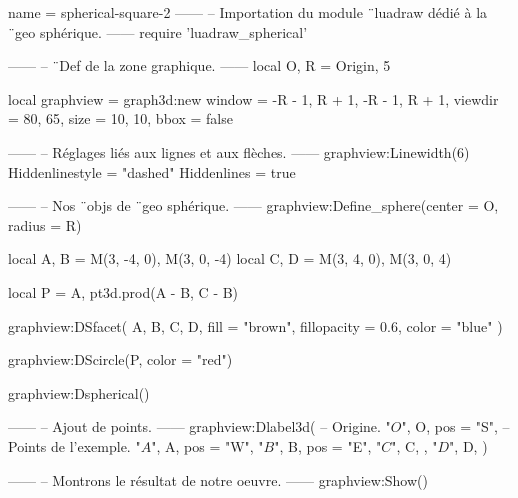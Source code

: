 \documentclass[border = 3pt]{standalone}
\begin{document}
\begin{luadraw}{name = spherical-square-2}
------
-- Importation du module ¨luadraw dédié à la ¨geo sphérique.
------
require 'luadraw_spherical'

------
-- ¨Def de la zone graphique.
------
local O, R = Origin, 5

local graphview = graph3d:new{
  window  = {-R - 1, R + 1, -R - 1, R + 1},
  viewdir = {80, 65},
  size    = {10, 10},
  bbox    = false
}

------
-- Réglages liés aux lignes et aux flèches.
------
graphview:Linewidth(6)
Hiddenlinestyle = "dashed"
Hiddenlines     = true

------
-- Nos ¨objs de ¨geo sphérique.
------
graphview:Define_sphere({center = O, radius = R})

local A, B = M(3, -4, 0), M(3, 0, -4)
local C, D = M(3, 4, 0), M(3, 0, 4)

local P = {A, pt3d.prod(A - B, C - B)}

graphview:DSfacet(
  {A, B, C, D},
  {fill = "brown", fillopacity = 0.6, color = "blue"}
)

graphview:DScircle(P, {color = "red"})

graphview:Dspherical()

------
-- Ajout de points.
------
graphview:Dlabel3d(
-- Origine.
  "$O$", O, {pos = "S"},
-- Points de l'exemple.
  "$A$", A, {pos = "W"},
  "$B$", B, {pos = "E"},
  "$C$", C, {},
  "$D$", D, {}
)

------
-- Montrons le résultat de notre oeuvre.
------
graphview:Show()
\end{luadraw}
\end{document}
